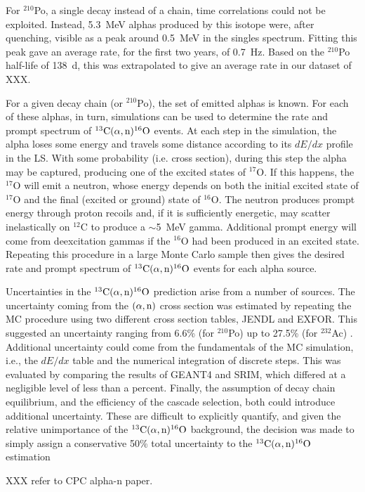 \documentclass[../thesis.tex]{subfiles}
\begin{document}
For $^{210}$Po, a single decay instead of a chain, time correlations could not be exploited. Instead, 5.3~MeV alphas produced by this isotope were, after quenching, visible as a peak around 0.5~MeV in the singles spectrum. Fitting this peak gave an average rate, for the first two years, of 0.7~Hz. Based on the $^{210}$Po half-life of 138~d, this was extrapolated to give an average rate in our dataset of XXX.

For a given decay chain (or $^{210}$Po), the set of emitted alphas is known. For each of these alphas, in turn, simulations can be used to determine the rate and prompt spectrum of $^{13}\mathrm{C}(\alpha, \mathrm{n})^{16}\mathrm{O}$ events. At each step in the simulation, the alpha loses some energy and travels some distance according to its $dE/dx$ profile in the LS. With some probability (i.e. cross section), during this step the alpha may be captured, producing one of the excited states of $^{17}$O. If this happens, the $^{17}$O will emit a neutron, whose energy depends on both the initial excited state of $^{17}$O and the final (excited or ground) state of $^{16}$O. The neutron produces prompt energy through proton recoils and, if it is sufficiently energetic, may scatter inelastically on $^{12}$C to produce a $\sim$5~MeV gamma. Additional prompt energy will come from deexcitation gammas if the $^{16}$O had been produced in an excited state. Repeating this procedure in a large Monte Carlo sample then gives the desired rate and prompt spectrum of $^{13}\mathrm{C}(\alpha, \mathrm{n})^{16}\mathrm{O}$ events for each alpha source.

Uncertainties in the $^{13}\mathrm{C}(\alpha, \mathrm{n})^{16}\mathrm{O}$ prediction arise from a number of sources. The uncertainty coming from the $(\alpha,\mathrm{n})$ cross section was estimated by repeating the MC procedure using two different cross section tables, JENDL and EXFOR. This suggested an uncertainty ranging from 6.6\% (for $^{210}$Po) up to 27.5\% (for $^{232}$Ac) \cite{Zhao_2014}. Additional uncertainty could come from the fundamentals of the MC simulation, i.e., the $dE/dx$ table and the numerical integration of discrete steps. This was evaluated by comparing the results of GEANT4 and SRIM, which differed at a negligible level of less than a percent. Finally, the assumption of decay chain equilibrium, and the efficiency of the cascade selection, both could introduce additional uncertainty. These are difficult to explicitly quantify, and given the relative unimportance of the $^{13}\mathrm{C}(\alpha, \mathrm{n})^{16}\mathrm{O}$ background, the decision was made to simply assign a conservative 50\% total uncertainty to the $^{13}\mathrm{C}(\alpha, \mathrm{n})^{16}\mathrm{O}$ estimation

XXX refer to CPC alpha-n paper.
\end{document}
